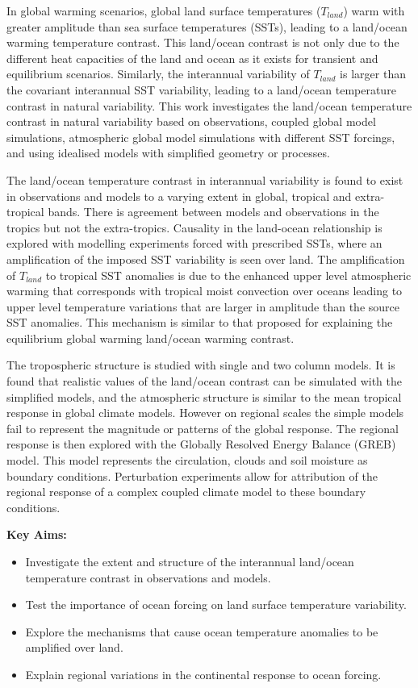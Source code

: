 In global warming scenarios, global land surface temperatures ($T_{land}$) warm 
with greater amplitude than sea surface temperatures (SSTs), leading to a 
land/ocean warming temperature contrast. This land/ocean contrast is not only 
due to the different heat capacities of the land and ocean as it exists for 
transient and equilibrium scenarios.  Similarly, the interannual variability of 
$T_{land}$ is larger than the covariant interannual SST variability, leading to 
a land/ocean temperature contrast in natural variability.  This work 
investigates the land/ocean temperature contrast in natural variability based on 
observations, coupled global model simulations, atmospheric global model 
simulations with different SST forcings, and using idealised models with 
simplified geometry or processes.

The land/ocean temperature contrast in interannual variability is found to exist 
in observations and models to a varying extent in global, tropical and 
extra-tropical bands. There is agreement between models and observations in the 
tropics but not the extra-tropics. Causality in the land-ocean relationship is 
explored with modelling experiments forced with prescribed SSTs, where an 
amplification of the imposed SST variability is seen over land.  The 
amplification of $T_{land}$ to tropical SST anomalies is due to the enhanced 
upper level atmospheric warming that corresponds with tropical moist convection 
over oceans leading to upper level temperature variations that are larger in 
amplitude than the source SST anomalies. This mechanism is similar to that 
proposed for explaining the equilibrium global warming land/ocean warming 
contrast.

The tropospheric structure is studied with single and two column models. It is 
found that realistic values of the land/ocean contrast can be simulated with the 
simplified models, and the atmospheric structure is similar to the mean tropical 
response in global climate models. However on regional scales the simple models 
fail to represent the magnitude or patterns of the global response. The regional 
response is then explored with the Globally Resolved Energy Balance (GREB) 
model.  This model represents the circulation, clouds and soil moisture as 
boundary conditions. Perturbation experiments allow for attribution of the 
regional response of a complex coupled climate model to these boundary 
conditions.

\pagebreak
\textbf{Key Aims:}
\begin{itemize}
	\item Investigate the extent and structure of the interannual land/ocean 
		temperature contrast in observations and models.
	\item Test the importance of ocean forcing on land surface temperature 
		variability.
	\item Explore the mechanisms that cause ocean temperature anomalies to be 
		amplified over land.
	\item Explain regional variations in the continental response to ocean 
		forcing.
\end{itemize}